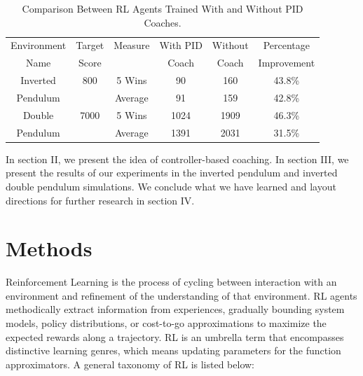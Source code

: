 \documentclass{IJCAS}
\begin{document}
\begin{table}
\scriptsize
\caption{Comparison Between RL Agents Trained With and Without PID Coaches.}
\label{episode_compare}
\centering
\begin{tabular}{ cccccc }
\rowcolor{airforceblue}

Environment & Target & Measure & With PID & Without & Percentage\\
\rowcolor{airforceblue}

Name & Score & & Coach & Coach & Improvement \\
Inverted & 800& 5 Wins & 90 & 160& 43.8\% \\
Pendulum & &Average & 91 & 159& 42.8\%\\
\rowcolor{beaublue}
Double & 7000& 5 Wins & 1024 & 1909& 46.3\%\\
\rowcolor{beaublue}
Pendulum & &Average & 1391 & 2031& 31.5\%\\

\end{tabular}
\end{table}

In section II, we present the idea of controller-based coaching. In section III, we present the results of our experiments in the inverted pendulum and inverted double pendulum simulations. We conclude what we have learned and layout directions for further research in section IV.

\section{Methods}

Reinforcement Learning is the process of cycling between interaction with an environment and refinement of the understanding of that environment. RL agents methodically extract information from experiences, gradually bounding system models, policy distributions, or cost-to-go approximations to maximize the expected rewards along a trajectory. RL is an umbrella term that encompasses distinctive learning genres, which means updating parameters for the function approximators. A general taxonomy of RL is listed below:
\end{document}
